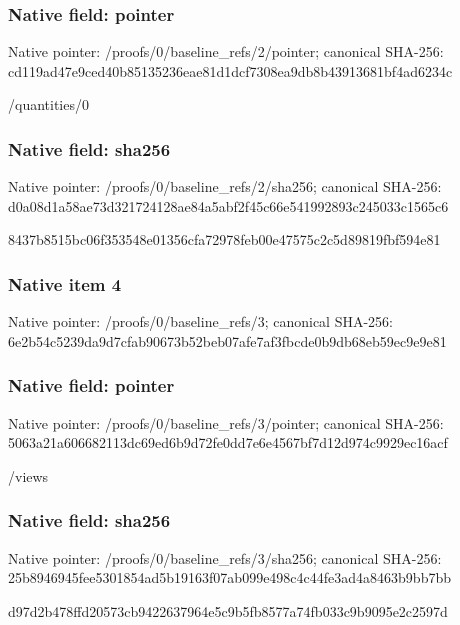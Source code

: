 \documentclass[10pt,a4paper]{article}
\begin{document}
\subsubsection{Native field: pointer}
Native pointer: /proofs/0/baseline\_\allowbreak{}refs/2/pointer; canonical SHA-256: cd119ad47e9ced40b85135236eae81d1dcf7308ea9db8b43913681bf4ad6234c

\begingroup\raggedright\sloppy /\allowbreak{}quantities/\allowbreak{}0\par\endgroup

\subsubsection{Native field: sha256}
Native pointer: /proofs/0/baseline\_\allowbreak{}refs/2/sha256; canonical SHA-256: d0a08d1a58ae73d321724128ae84a5abf2f45c66e541992893c245033c1565c6

\begingroup\raggedright\sloppy 8437b8515bc06f353548e01356cfa72978feb00e47575c2c5d89819fbf594e81\par\endgroup

\subsubsection{Native item 4}
Native pointer: /proofs/0/baseline\_\allowbreak{}refs/3; canonical SHA-256: 6e2b54c5239da9d7cfab90673b52beb07afe7af3fbcde0b9db68eb59ec9e9e81

\subsubsection{Native field: pointer}
Native pointer: /proofs/0/baseline\_\allowbreak{}refs/3/pointer; canonical SHA-256: 5063a21a606682113dc69ed6b9d72fe0dd7e6e4567bf7d12d974c9929ec16acf

\begingroup\raggedright\sloppy /\allowbreak{}views\par\endgroup

\subsubsection{Native field: sha256}
Native pointer: /proofs/0/baseline\_\allowbreak{}refs/3/sha256; canonical SHA-256: 25b8946945fee5301854ad5b19163f07ab099e498c4c44fe3ad4a8463b9bb7bb

\begingroup\raggedright\sloppy d97d2b478ffd20573cb9422637964e5c9b5fb8577a74fb033c9b9095e2c2597d\par\endgroup
\end{document}

